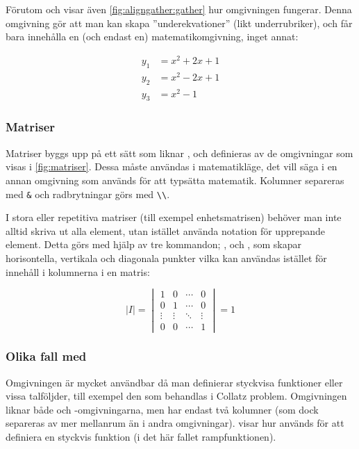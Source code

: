 \documentclass[lang=sv,ptsize=10pt,font=none,nomath,titles=bf,../../a4.tex]{subfiles}
\begin{document}
\clearpage
{}
Förutom  och  visar även \cref{fig:aligngather:gather} hur omgivningen  fungerar. Denna
omgivning gör att man kan skapa ”underekvationer” (likt underrubriker),
och får bara innehålla en (och endast en) matematikomgivning, inget annat:
\begin{latexcode}
\begin{subequations}
\begin{align}
y_1 &= x^2 + 2x + 1 \\
y_2 &= x^2 - 2x + 1 \\
y_3 &= x^2 - 1
\end{align}
\end{subequations}
\end{latexcode}

\subsubsection{Matriser}
Matriser byggs upp på ett sätt som liknar , och definieras
av de omgivningar som visas i \cref{fig:matriser}. Dessa måste
användas i matematikläge, det vill säga i en annan omgivning som används
för att typsätta matematik. Kolumner separeras med \verb|&| och
radbrytningar görs med \verb|\\|.

I stora eller repetitiva matriser (till exempel enhetsmatrisen) behöver
man inte alltid skriva ut alla element, utan istället använda notation
för upprepande element. Detta görs med hjälp av tre kommandon; 
	,  och , som skapar horisontella,
	vertikala och diagonala punkter vilka kan användas istället för innehåll
i kolumnerna i en matris:\label{sec:3:matrispktr}
\begin{latexcode}
\begin{equation*}
\lvert I\rvert = \begin{vmatrix}
1      & 0      & \cdots & 0      \\
0      & 1      & \cdots & 0      \\ 
\vdots & \vdots & \ddots & \vdots \\
0      & 0      & \cdots & 1
\end{vmatrix} = 1
\end{equation*}
\end{latexcode}

\subsubsection{Olika fall med }
Omgivningen  är mycket användbar då man definierar styckvisa
funktioner eller vissa talföljder, till exempel den som behandlas i 
Collatz problem.
Omgivningen liknar både  och -omgivningarna, men
har endast två kolumner (som dock separeras av mer mellanrum än i andra
omgivningar).  visar hur  används för
att definiera en styckvis funktion (i det här fallet rampfunktionen).
\end{document}
